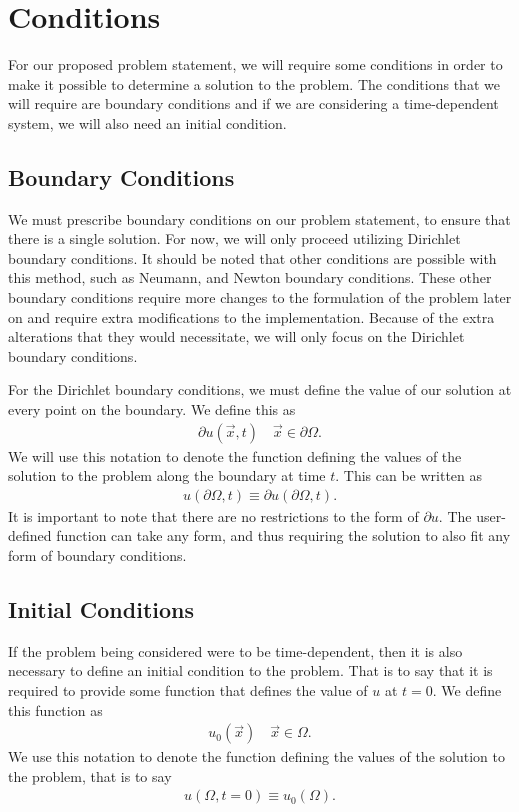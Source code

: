 \documentclass[../fem.tex]{subfile}
\begin{document}
\section{Conditions}%
\label{sec:conditions}

For our proposed problem statement, we will require some conditions in order to
make it possible to determine a solution to the problem. The conditions that we
will require are boundary conditions and if we are considering a time-dependent
system, we will also need an initial condition.

\subsection{Boundary Conditions}%
\label{sub:boundary_conditions}

We must prescribe boundary conditions on our problem statement, to ensure that
there is a single solution. For now, we will only proceed utilizing Dirichlet
boundary conditions. It should be noted that other conditions are possible with
this method, such as Neumann, and Newton boundary conditions. These other
boundary conditions require more changes to the formulation of the problem
later on and require extra modifications to the implementation. Because of the
extra alterations that they would necessitate, we will only focus on the
Dirichlet boundary conditions.

For the Dirichlet boundary conditions, we must define the value of our solution
at every point on the boundary. We define this as
\begin{align*}
  \partial u(\vec{x},t)\quad\vec{x}\in\partial\Omega.
\end{align*}
We will use this notation to denote the function defining the values of the
solution to the problem along the boundary at time $t$. This can be written as
\begin{align*}
  u(\partial\Omega,t)\equiv\partial u(\partial\Omega,t).
\end{align*}
It is important to note that there are no restrictions to the form of $\partial
u$. The user-defined function can take any form, and thus requiring the
solution to also fit any form of boundary conditions.

\subsection{Initial Conditions}%
\label{sub:initial_conditions}

If the problem being considered were to be time-dependent, then it is also
necessary to define an initial condition to the problem. That is to say that it
is required to provide some function that defines the value of $u$ at $t=0$. We
define this function as
\begin{align*}
  u_0(\vec{x})\quad\vec{x}\in\Omega.
\end{align*}
We use this notation to denote the function defining the values of the
solution to the problem, that is to say
\begin{align*}
  u(\Omega,t=0)\equiv u_0(\Omega).
\end{align*}
\end{document}
